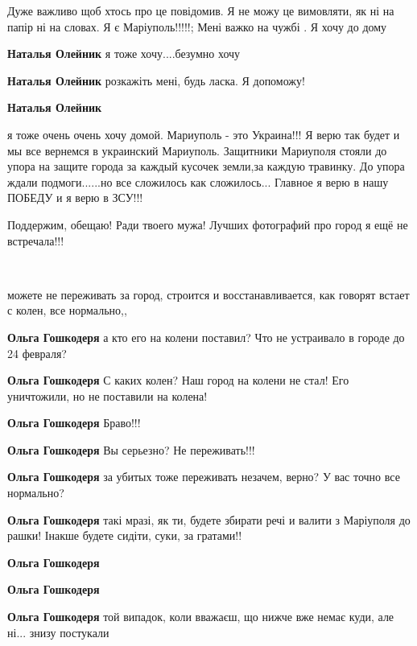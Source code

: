 
Дуже важливо щоб хтось про це повідомив. Я не можу це вимовляти, як ні на папір
ні на словах. Я є Маріуполь!!!!!; Мені важко на чужбі . Я хочу до дому

\begin{itemize} %
\textbf{Наталья Олейник} я тоже хочу....безумно хочу

\textbf{Наталья Олейник} розкажіть мені, будь ласка. Я допоможу!

\textbf{Наталья Олейник} 

я тоже очень очень хочу домой. Мариуполь - это Украина!!! Я верю так будет и мы
все вернемся в украинский Мариуполь. Защитники Мариуполя стояли до упора на
защите города за каждый кусочек земли,за каждую травинку. До упора ждали
подмоги......но все сложилось как сложилось... Главное я верю в нашу ПОБЕДУ и я
верю в ЗСУ!!!

\end{itemize} %


Поддержим, обещаю! Ради твоего мужа! Лучших фотографий про город я ещё не встречала!!!

🥺😭😢


можете не переживать за город, строится и восстанавливается, как говорят встает
с колен, все нормально,,

\begin{itemize} %
\textbf{Ольга Гошкодеря} а кто его на колени поставил? Что не устраивало в городе до 24 февраля?

\textbf{Ольга Гошкодеря} С каких колен? Наш город на колени не стал! Его уничтожили, но не поставили на колена!

\textbf{Ольга Гошкодеря} Браво!!!

\textbf{Ольга Гошкодеря} Вы серьезно? Не переживать!!!

\textbf{Ольга Гошкодеря} за убитых тоже переживать незачем, верно? У вас точно все нормально?

\textbf{Ольга Гошкодеря} такі мразі, як ти, будете збирати речі и валити з Маріуполя до рашки! Інакше будете сидіти, суки, за гратами!!

\textbf{Ольга Гошкодеря} 🤮

\textbf{Ольга Гошкодеря} 💩💩💩💩

\textbf{Ольга Гошкодеря} той випадок, коли вважаєш, що нижче вже немає куди, але ні... знизу постукали 🤯
\end{itemize} %

